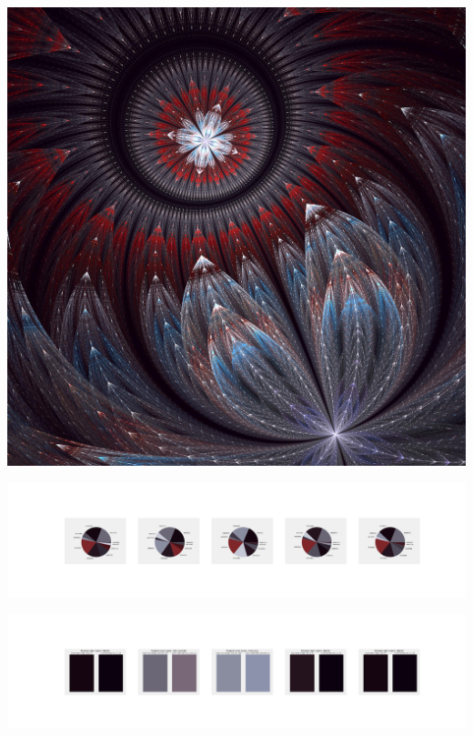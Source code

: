 \documentclass[11pt]{article}
\begin{document}
\begin{landscape}
    \begin{center}
    \includegraphics[width=\textwidth]{./nbimg/file (241).jpg}
    \end{center}

    \begin{center}
    \includegraphics[width=250mm]{./nbimg/pie-158.jpg}
    \end{center}

    \begin{center}
    \includegraphics[width=250mm]{./nbimg/peak-158.jpg}
    \end{center}
    


\end{landscape}
\end{document}
